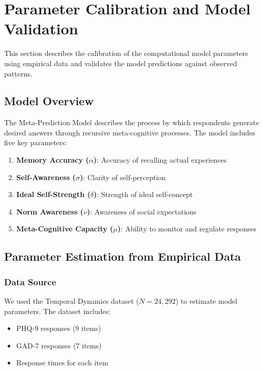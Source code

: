 
\section{Parameter Calibration and Model Validation}

This section describes the calibration of the computational model parameters using empirical data and validates the model predictions against observed patterns.

\subsection{Model Overview}

The Meta-Prediction Model describes the process by which respondents generate desired answers through recursive meta-cognitive processes. The model includes five key parameters:

\begin{enumerate}
    \item \textbf{Memory Accuracy ($\alpha$)}: Accuracy of recalling actual experiences
    \item \textbf{Self-Awareness ($\sigma$)}: Clarity of self-perception
    \item \textbf{Ideal Self-Strength ($\delta$)}: Strength of ideal self-concept
    \item \textbf{Norm Awareness ($\nu$)}: Awareness of social expectations
    \item \textbf{Meta-Cognitive Capacity ($\mu$)}: Ability to monitor and regulate responses
\end{enumerate}

\subsection{Parameter Estimation from Empirical Data}

\subsubsection{Data Source}

We used the Temporal Dynamics dataset ($N = 24,292$) to estimate model parameters. The dataset includes:
\begin{itemize}
    \item PHQ-9 responses (9 items)
    \item GAD-7 responses (7 items)
    \item Response times for each item
\end{itemize}

